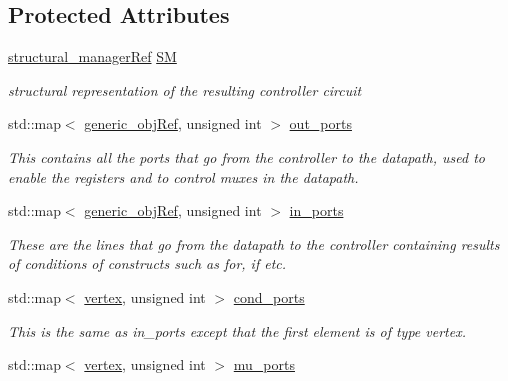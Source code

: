 \subsection*{Protected Attributes}
\begin{DoxyCompactItemize}
\item 
\hyperlink{structural__manager_8hpp_ab3136f0e785d8535f8d252a7b53db5b5}{structural\+\_\+manager\+Ref} \hyperlink{classControllerCreatorBaseStep_a734af585945c1206eda3c2ac884f9f45}{SM}
\begin{DoxyCompactList}\small\item\em structural representation of the resulting controller circuit \end{DoxyCompactList}\item 
std\+::map$<$ \hyperlink{generic__obj_8hpp_acb533b2ef8e0fe72e09a04d20904ca81}{generic\+\_\+obj\+Ref}, unsigned int $>$ \hyperlink{classControllerCreatorBaseStep_a2efc96be086bbbf888e66a80c629c85c}{out\+\_\+ports}
\begin{DoxyCompactList}\small\item\em This contains all the ports that go from the controller to the datapath, used to enable the registers and to control muxes in the datapath. \end{DoxyCompactList}\item 
std\+::map$<$ \hyperlink{generic__obj_8hpp_acb533b2ef8e0fe72e09a04d20904ca81}{generic\+\_\+obj\+Ref}, unsigned int $>$ \hyperlink{classControllerCreatorBaseStep_a0d60e828352fd20c95a96dffe0ac9a28}{in\+\_\+ports}
\begin{DoxyCompactList}\small\item\em These are the lines that go from the datapath to the controller containing results of conditions of constructs such as for, if etc. \end{DoxyCompactList}\item 
std\+::map$<$ \hyperlink{graph_8hpp_abefdcf0544e601805af44eca032cca14}{vertex}, unsigned int $>$ \hyperlink{classControllerCreatorBaseStep_a2a6927fede489baf53ad52f8a2fd8142}{cond\+\_\+ports}
\begin{DoxyCompactList}\small\item\em This is the same as in\+\_\+ports except that the first element is of type vertex. \end{DoxyCompactList}\item 
std\+::map$<$ \hyperlink{graph_8hpp_abefdcf0544e601805af44eca032cca14}{vertex}, unsigned int $>$ \hyperlink{classControllerCreatorBaseStep_aa977dc37a0cf88574c90ad4d4af78fb9}{mu\+\_\+ports}

\end{DoxyCompactItemize}

